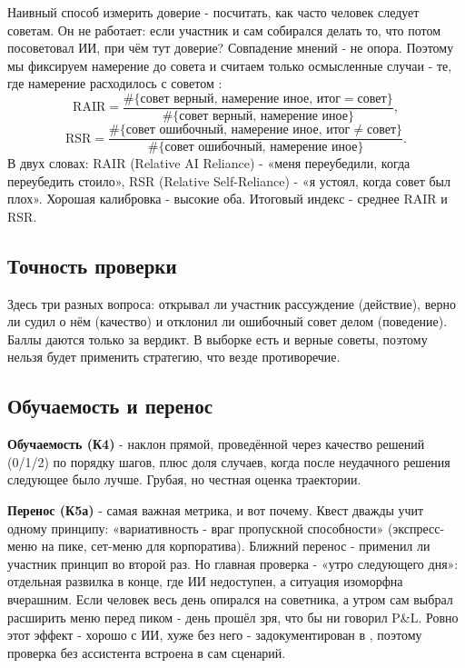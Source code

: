 \documentclass[12pt,a4paper]{article}
\begin{document}
Наивный способ измерить доверие - посчитать, как часто человек следует советам. Он не работает: если участник и сам собирался делать то, что потом посоветовал ИИ, при чём тут доверие? Совпадение мнений - не опора. Поэтому мы фиксируем намерение до совета и считаем только осмысленные случаи - те, где намерение расходилось с советом \cite{schemmer2023}:
\[
\mathrm{RAIR}=\frac{\#\{\text{совет верный, намерение иное, итог}=\text{совет}\}}
                   {\#\{\text{совет верный, намерение иное}\}},
\]
\[
\mathrm{RSR}=\frac{\#\{\text{совет ошибочный, намерение иное, итог}\neq\text{совет}\}}
                  {\#\{\text{совет ошибочный, намерение иное}\}}.
\]
В двух словах: RAIR (Relative AI Reliance) - «меня переубедили, когда переубедить стоило», RSR (Relative Self-Reliance) - «я устоял, когда совет был плох». Хорошая калибровка - высокие оба. Итоговый индекс - среднее RAIR и RSR.

\subsection{Точность проверки}

Здесь три разных вопроса: открывал ли участник рассуждение (действие), верно ли судил о нём (качество) и отклонил ли ошибочный совет делом (поведение). Баллы даются только за вердикт. В выборке есть и верные советы, поэтому нельзя будет применить стратегию, что везде противоречие. 
\subsection{Обучаемость и перенос}

\textbf{Обучаемость (К4)} - наклон прямой, проведённой через качество решений (0/1/2) по порядку шагов, плюс доля случаев, когда после неудачного решения следующее было лучше. Грубая, но честная оценка траектории.

\textbf{Перенос (К5а)} - самая важная метрика, и вот почему. Квест дважды учит одному принципу: «вариативность - враг пропускной способности» (экспресс-меню на пике, сет-меню для корпоратива). Ближний перенос - применил ли участник принцип во второй раз. Но главная проверка - «утро следующего дня»: отдельная развилка в конце, где ИИ недоступен, а ситуация изоморфна вчерашним. Если человек весь день опирался на советника, а утром сам выбрал расширить меню перед пиком - день прошёл зря, что бы ни говорил P\&L. Ровно этот эффект - хорошо с ИИ, хуже без него - задокументирован в \cite{bastani2025}, поэтому проверка без ассистента встроена в сам сценарий.
\end{document}
